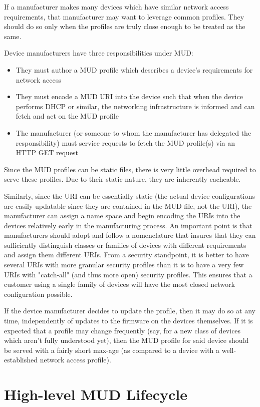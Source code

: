 \documentclass[conference]{IEEEtran}
\begin{document}
If a manufacturer makes many devices which have similar network access
requirements, that manufacturer may want to leverage common profiles.
They should do so only when the profiles are truly close enough to be
treated as the same.

Device manufacturers have three responsibilities under MUD:
\begin{itemize}
\item They must author a MUD profile which describes a device's
  requirements for network access
\item They must encode a MUD URI into the device such that when the
  device performs DHCP or similar, the networking infrastructure is
  informed and can fetch and act on the MUD profile
\item The manufacturer (or someone to whom the manufacturer has
  delegated the responsibility) must service requests to fetch the MUD
  profile(s) via an HTTP GET request
\end{itemize}
Since the MUD profiles can be static files, there is very little
overhead required to serve these profiles.  Due to their static
nature, they are inherently cacheable.

Similarly, since the URI can be essentially static (the actual device
configurations are easily updatable since they are contained in the
MUD file, not the URI), the manufacturer can assign a name space and
begin encoding the URIs into the devices relatively early in the
manufacturing process.  An important point is that manufacturers
should adopt and follow a nomenclature that insures that they can
sufficiently distinguish classes or families of devices with different
requirements and assign them different URIs.  From a security
standpoint, it is better to have several URIs with more granular
security profiles than it is to have a very few URIs with "catch-all"
(and thus more open) security profiles.  This ensures that a customer
using a single family of devices will have the most closed network
configuration possible.

If the device manufacturer decides to update the profile, then it may
do so at any time, independently of updates to the firmware on the
devices themselves.  If it is expected that a profile may change
frequently (say, for a new class of devices which aren't fully
understood yet), then the MUD profile for said device should be served
with a fairly short max-age (as compared to a device with a
well-established network access profile).

\section{High-level MUD Lifecycle}
\end{document}
